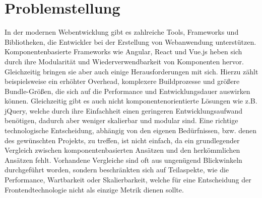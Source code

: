 \documentclass[oneside]{ausarbeitung}
\begin{document}
\section{Problemstellung}
\label{sec:problemstellung}

In der modernen Webentwicklung gibt es zahlreiche Tools, Frameworks und Bibliotheken, die Entwickler bei der Erstellung von Webanwendung unterstützen. Komponentenbasierte Frameworks wie Angular, React und Vue.js heben sich durch ihre Modularität und Wiederverwendbarkeit von Komponenten hervor. Gleichzeitig bringen sie aber auch einige Herausforderungen mit sich. Hierzu zählt beispielsweise ein erhöhter Overhead, komplexere Buildprozesse und größere Bundle-Größen, die sich auf die Performance und Entwicklungsdauer auswirken können.
Gleichzeitig gibt es auch nicht komponentenorientierte Lösungen wie z.B. jQuery, welche durch ihre Einfachheit einen geringeren Entwicklungsaufwand benötigen, dadurch aber weniger skalierbar und modular sind. 
Eine richtige technologische Entscheidung, abhängig von den eigenen Bedürfnissen, bzw. denen des gewünschten Projekts, zu treffen, ist nicht einfach, da ein grundlegender Vergleich zwischen komponentenbasierten Ansätzen und den herkömmlichen Ansätzen fehlt. Vorhandene Vergleiche sind oft aus ungenügend Blickwinkeln durchgeführt worden, sondern beschränkten sich auf Teilaspekte, wie die Performance, Wartbarkeit oder Skalierbarkeit, welche für eine Entscheidung der Frontendtechnologie nicht als einzige Metrik dienen sollte. 
\end{document}
